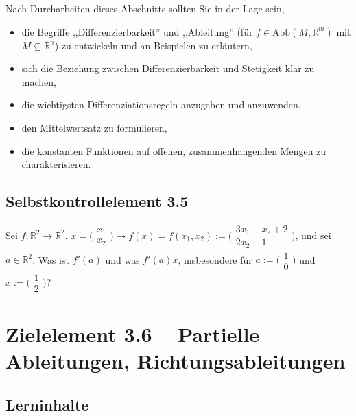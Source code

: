 \documentclass[a4paper,12pt]{article}
\begin{document}
Nach Durcharbeiten dieses Abschnitts sollten Sie in der Lage sein,
\begin{itemize}
  \item die Begriffe ,,Differenzierbarkeit'' und ,,Ableitung'' (f\"ur
        $f \in \mathrm{Abb}(M, \mathbb{R}^m)$ mit $M \subseteq \mathbb{R}^n$)
        zu entwickeln und an Beispielen zu erl\"autern,
  \item sich die Beziehung zwischen Differenzierbarkeit und Stetigkeit klar
        zu machen,
  \item die wichtigsten Differenziationsregeln anzugeben und anzuwenden,
  \item den Mittelwertsatz zu formulieren,
  \item die konstanten Funktionen auf offenen, zusammenh\"angenden Mengen zu
        charakterisieren.
\end{itemize}

\subsection*{Selbstkontrollelement 3.5}

Sei $f : \mathbb{R}^2 \to \mathbb{R}^2$,
$x = \bigl(\begin{smallmatrix} x_1 \\ x_2 \end{smallmatrix}\bigr) \mapsto
 f(x) = f(x_1, x_2) := \bigl(\begin{smallmatrix} 3x_1 - x_2 + 2 \\ 2x_2 - 1 \end{smallmatrix}\bigr)$,
und sei $a \in \mathbb{R}^2$. Was ist $f'(a)$ und was $f'(a)x$, insbesondere
f\"ur $a := \bigl(\begin{smallmatrix} 1 \\ 0 \end{smallmatrix}\bigr)$ und
$x := \bigl(\begin{smallmatrix} 1 \\ 2 \end{smallmatrix}\bigr)$?

\newpage

\section*{Zielelement 3.6 -- Partielle Ableitungen, Richtungsableitungen}

\subsection*{Lerninhalte}
\end{document}

